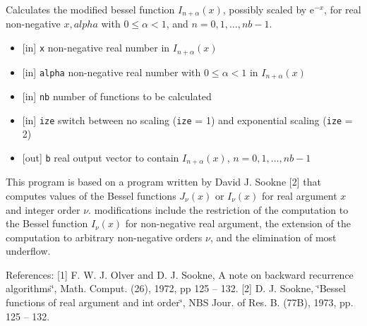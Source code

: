 Calculates the modified bessel function $I_{n+\alpha}(x)$, possibly scaled by $\mathrm{e}^{-x}$, for real non-negative $x,alpha$ with $0 \le \alpha < 1$, and $n=0,1,\ldots,nb-1$. 

\begin{itemize}
\item \mbox{[}in\mbox{]} {\tt x} non-negative real number in $I_{n+\alpha}(x)$ \item \mbox{[}in\mbox{]} {\tt alpha} non-negative real number with $0 \le \alpha < 1$ in $I_{n+\alpha}(x)$ \item \mbox{[}in\mbox{]} {\tt nb} number of functions to be calculated \item \mbox{[}in\mbox{]} {\tt ize} switch between no scaling ({\tt ize} = 1) and exponential scaling ({\tt ize} = 2) \item \mbox{[}out\mbox{]} {\tt b} real output vector to contain $I_{n+\alpha}(x)$, $n=0,1,\ldots,nb-1$ 
\end{itemize}
This program is based on a program written by David J. Sookne \mbox{[}2\mbox{]} that computes values of the Bessel functions $J_{\nu}(x)$ or $I_{\nu}(x)$ for real argument $x$ and integer order $\nu$. modifications include the restriction of the computation to the Bessel function $I_{\nu}(x)$ for non-negative real argument, the extension of the computation to arbitrary non-negative orders $\nu$, and the elimination of most underflow.

References: \mbox{[}1\mbox{]} F. W. J. Olver and D. J. Sookne, A note on backward recurrence algorithms\char`\"{}, Math. Comput. (26), 1972, pp 125 -- 132. \mbox{[}2\mbox{]} D. J. Sookne, \char`\"{}Bessel functions of real argument and int order\char`\"{}, NBS Jour. of Res. B. (77B), 1973, pp. 125 -- 132.

